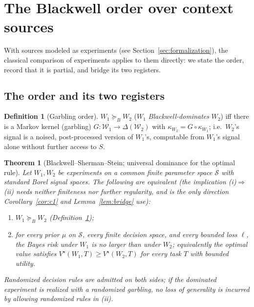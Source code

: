 \documentclass[11pt]{article}
\theoremstyle{plain}
\newtheorem{theorem}{Theorem}
\theoremstyle{definition}
\newtheorem{definition}{Definition}
\theoremstyle{remark}
\newcommand{\Wcal}{\mathcal{W}}
\newcommand{\Scal}{\mathcal{S}}
\newcommand{\Bord}{\succeq_{B}}
\begin{document}

\section{The Blackwell order over context sources}
\label{sec:order}

With sources modeled as experiments (see Section~\ref{sec:formalization}), the classical comparison of
experiments applies to them directly: we state the order, record that it is partial, and bridge
its two registers.

\subsection{The order and its two registers}

\begin{definition}[Garbling order]
\label{def:blackwell}
$W_1 \Bord W_2$ ($W_1$ \emph{Blackwell-dominates} $W_2$) iff there is a Markov kernel
(garbling) $G : \Wcal_1 \to \Delta(\Wcal_2)$ with $\kappa_{W_2} = G \circ \kappa_{W_1}$;
i.e.\ $W_2$'s signal is a noised, post-processed version of $W_1$'s, computable from $W_1$'s signal
alone without further access to $S$.
\end{definition}

\begin{theorem}[Blackwell--Sherman--Stein; universal dominance for the optimal rule]
\label{thm:blackwell}
Let $W_1, W_2$ be experiments on a common \emph{finite} parameter space $\Scal$ with standard
Borel signal spaces. The following are equivalent (the implication
\textup{(i)}$\Rightarrow$\textup{(ii)} needs neither finiteness nor further regularity, and is the
only direction Corollary~\ref{cor:c1} and Lemma~\ref{lem:bridge} use):
\begin{enumerate}
  \item[\textup{(i)}] $W_1 \Bord W_2$ (Definition~\ref{def:blackwell});
  \item[\textup{(ii)}] for every prior $\mu$ on $\Scal$, every finite decision space, and every
    bounded loss $\ell$, the Bayes risk under $W_1$ is no larger than under $W_2$; equivalently the
    optimal value satisfies $V^\star(W_1,T) \ge V^\star(W_2,T)$ for every task $T$ with bounded
    utility.
\end{enumerate}
Randomized decision rules are admitted on both sides; if the dominated experiment is realized with
a randomized garbling, no loss of generality is incurred by allowing randomized rules in
\textup{(ii)}.
\end{theorem}
\end{document}
